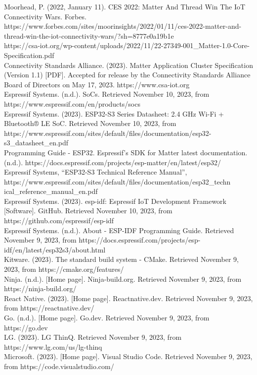 \documentclass[conference]{IEEEtran}
\begin{document}
\begin{thebibliography}{00}
 Moorhead, P. (2022, January 11). CES 2022: Matter And Thread Win The IoT Connectivity Wars. Forbes. https://www.forbes.com/sites/moorinsights/2022/01/11/ces-2022-matter-and-thread-win-the-iot-connectivity-wars/?sh=8777e0a19b1e\\
 https://csa-iot.org/wp-content/uploads/2022/11/22-27349-001\_Matter-1.0-Core-Specification.pdf\\
 Connectivity Standards Alliance. (2023). Matter Application Cluster Specification (Version 1.1) [PDF]. Accepted for release by the Connectivity Standards Alliance Board of Directors on May 17, 2023. https://www.csa-iot.org\\
 Espressif Systems. (n.d.). SoCs. Retrieved November 10, 2023, from https://www.espressif.com/en/products/socs\\
 Espressif Systems. (2023). ESP32-S3 Series Datasheet: 2.4 GHz Wi-Fi + Bluetooth® LE SoC. Retrieved November 10, 2023, from https://www.espressif.com/sites/default/files/documentation/esp32-s3\_datasheet\_en.pdf\\
 Programming Guide - ESP32. Espressif’s SDK for Matter latest documentation. (n.d.). https://docs.espressif.com/projects/esp-matter/en/latest/esp32/ \\
 Espressif Systems, “ESP32-S3 Technical Reference Manual”, https://www.espressif.com/sites/default/files/documentation/esp32\_techn\\ical\_reference\_manual\_en.pdf\\
 Espressif Systems. (2023). esp-idf: Espressif IoT Development Framework [Software]. GitHub. Retrieved November 10, 2023, from https://github.com/espressif/esp-idf\\
 Espressif Systems. (n.d.). About - ESP-IDF Programming Guide. Retrieved November 9, 2023, from https://docs.espressif.com/projects/esp-idf/en/latest/esp32s3/about.html\\
 Kitware. (2023). The standard build system - CMake. Retrieved November 9, 2023, from https://cmake.org/features/\\
 Ninja. (n.d.). [Home page]. Ninja-build.org. Retrieved November 9, 2023, from https://ninja-build.org/\\
 React Native. (2023). [Home page]. Reactnative.dev. Retrieved November 9, 2023, from https://reactnative.dev/\\
 Go. (n.d.). [Home page]. Go.dev. Retrieved November 9, 2023, from https://go.dev\\
 LG. (2023). LG ThinQ. Retrieved November 9, 2023, from https://www.lg.com/us/lg-thinq\\
 Microsoft. (2023). [Home page]. Visual Studio Code. Retrieved November 9, 2023, from https://code.visualstudio.com/\\
\end{thebibliography}
\end{document}
